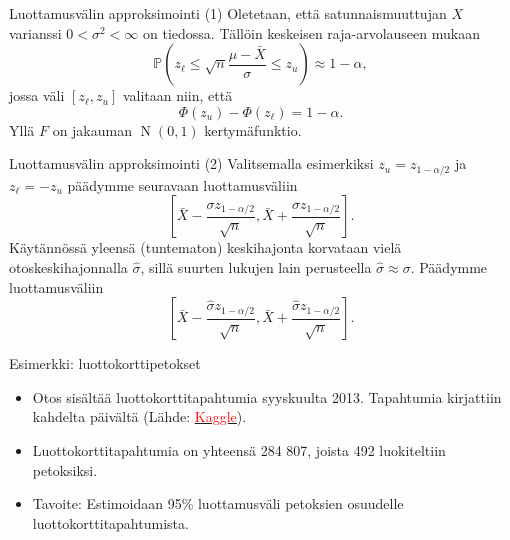\documentclass{beamer}
\DeclareMathOperator{\n}{\mathrm N}
\begin{document}

\begin{frame}{Luottamusvälin approksimointi (1)}
  Oletetaan, että satunnaismuuttujan $X$ varianssi $0 < \sigma^2 < \infty$ on
  tiedossa. Tällöin keskeisen raja-arvolauseen mukaan
  \begin{equation*}
    \mathbb{P}\left(z_{\ell} \leq \sqrt{n}\frac{\mu - \bar X}{\sigma}
    \leq z_u\right) \approx 1 - \alpha,
  \end{equation*}
  \pause
  jossa väli $[z_\ell, z_u]$ valitaan niin, että
  \begin{equation*}
    \Phi(z_u) - \Phi(z_\ell) = 1-\alpha.
  \end{equation*}
  Yllä $F$ on jakauman $\n\left(0,1\right)$ kertymäfunktio.
\end{frame}


\begin{frame}{Luottamusvälin approksimointi (2)}
  Valitsemalla esimerkiksi $z_u = z_{1 - \alpha/2}$ ja $z_\ell = -z_u$ päädymme
  seuravaan luottamusväliin
  \begin{equation*}
    \left[\bar X - \frac{\sigma z_{1 - \alpha/2}}{\sqrt{n}},
    \bar X + \frac{\sigma z_{1 - \alpha/2}}{\sqrt{n}}\right].
  \end{equation*}
  \pause
  Käytännössä yleensä (tuntematon) keskihajonta korvataan vielä
  otoskeskihajonnalla $\hat\sigma$, sillä suurten lukujen lain perusteella
  $\hat\sigma\approx\sigma$. Päädymme luottamusväliin
  \begin{equation*}
    \left[\bar X - \frac{\hat\sigma z_{1 - \alpha/2}}{\sqrt{n}},
    \bar X + \frac{\hat\sigma z_{1 - \alpha/2}}{\sqrt{n}}\right].
  \end{equation*}
\end{frame}


\begin{frame}{Esimerkki: luottokorttipetokset}
  \begin{itemize}
    \item Otos sisältää luottokorttitapahtumia syyskuulta 2013. Tapahtumia
    kirjattiin kahdelta päivältä
    (Lähde: \href{https://www.kaggle.com/datasets/mlg-ulb/creditcardfraud?resource=download}{\textcolor{red}{Kaggle}}).
    \pause
    \item Luottokorttitapahtumia on yhteensä 284 807, joista 492 luokiteltiin
    petoksiksi.
    \pause
    \item Tavoite: Estimoidaan 95\% luottamusväli petoksien osuudelle
    luottokorttitapahtumista.
  \end{itemize}
\end{frame}
\end{document}
